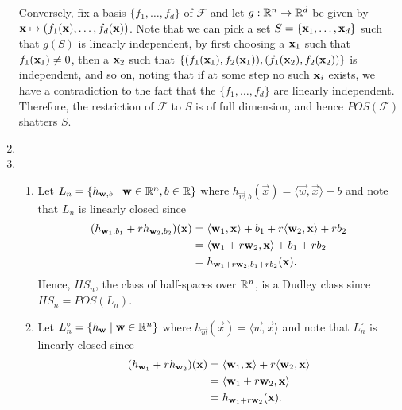 \begin{ex}
\begin{enumerate}
          Conversely, fix a basis $\{f_1,\ldots,f_d\}$ of $\mathcal{F}$ and let
          $g:\mathbb{R}^n \to \mathbb{R}^d$ be given by $\mathbf{x}\mapsto (f_1(\mathbf{x}),\ldots,f_d(\mathbf{x}))$.
          Note that we can pick a set $S=\{\mathbf{x}_1,\ldots, \mathbf{x}_d\}$ such
          that $g(S)$ is linearly independent, by first choosing a $\mathbf{x}_1$ such
          that $f_1(\mathbf{x}_1)\neq 0$, then a $\mathbf{x}_2$ such that
          $\{(f_1(\mathbf{x}_1), f_2(\mathbf{x}_1)), (f_1(\mathbf{x}_2), f_2(\mathbf{x}_2))\}$ is independent,
          and so on, noting that if at some step no such $\mathbf{x}_i$ exists, we have
          a contradiction to the fact that the $\{f_1, \ldots,f_d\}$ are
          linearly independent. Therefore, the restriction of $\mathcal{F}$
          to $S$ is of full dimension, and hence $POS(\mathcal{F})$ shatters
          $S$.
    \item
    \item[]
          \begin{enumerate}[1.]
            \item Let $L_n=\{h_{\mathbf{w},b} \mid \mathbf{w}\in\mathbb{R}^n, b\in \mathbb{R}\}$
                  where
                  $h_{\vec{w},b}(\vec{x}) =\langle\vec{w},\vec{x}\rangle + b$
                  and note that $L_n$ is linearly closed since
                  \begin{align*}
                    (h_{\mathbf{w}_1,b_1}+rh_{\mathbf{w}_2,b_2})(\mathbf{x})
                     & =\langle\mathbf{w}_1,\mathbf{x}\rangle + b_1
                    +r\langle\mathbf{w}_2,\mathbf{x}\rangle + rb_2        \\
                     & =\langle\mathbf{w}_1+r\mathbf{w}_2, \mathbf{x}\rangle
                    + b_1 + rb_2                               \\
                     & =h_{\mathbf{w}_1+r\mathbf{w}_2,b_1+rb_2}(\mathbf{x}).
                  \end{align*}
                  Hence, $HS_n$, the class of half-spaces over $\mathbb{R}^n$,
                  is a Dudley class since $HS_n=POS(L_n)$.
            \item Let $L^\circ_n=\{h_{\mathbf{w}} \mid \mathbf{w}\in\mathbb{R}^n \}$
                  where $h_{\vec{w}}(\vec{x})=\langle\vec{w},\vec{x}\rangle$
                  and note that $L^\circ_n$ is linearly closed since
                  \begin{align*}
                    (h_{\vec{w}_1}+rh_{\vec{w}_2})(\x)
                     & =\langle\vec{w}_1,\x\rangle
                    +r\langle\vec{w}_2,\x\rangle              \\
                     & =\langle\vec{w}_1+r\vec{w}_2,\x\rangle \\
                     & =h_{\vec{w}_1+r\vec{w}_2}(\x).

\end{align*}
\end{enumerate}
\end{enumerate}
\end{ex}
